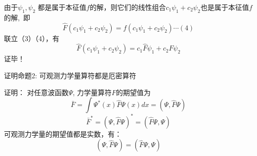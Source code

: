 \begin{frame} 
    由于$\psi_1, \psi_2$ 都是属于本征值$f$的解，则它们的线性组合$c_1\psi_1+c_2\psi_2$也是属于本征值$f$的解, 即
    $$\hat{F}(c_1\psi_1+c_2\psi_2)=f(c_1\psi_1+c_2\psi_2)\cdots (4)$$
    联立（3）（4），有
    $$\hat{F}(c_1\psi_1+c_2\psi_2)=c_1\hat{F}\psi_1+c_2\hat{F}\psi_2$$
    证毕！
\end{frame} 

\begin{frame} 
    \begin{tcolorbox1}{证明命题2:}
        可观测力学量算符都是厄密算符  
    \end{tcolorbox1}
    \alert{证明：}
        对任意波函数$\Psi$, 力学量算符$F$的期望值为\\
        $$\bar{F}=\int \Psi^{*}(x) \hat{F} \Psi(x) d x=(\Psi,\hat{F} \Psi) $$
        $$\bar{F}^*=(\Psi, \hat{F} \Psi)^* = (\hat{F}\Psi, \Psi) $$
        可观测力学量的期望值都是实数，有：\\
        $$(\Psi,\hat{F}\Psi)=(\hat{F} \Psi, \Psi) $$
\end{frame} 

